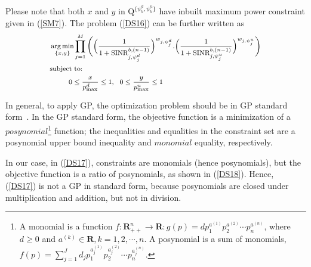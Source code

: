 \documentclass[journal]{IEEEtran}
\DeclareMathOperator*{\argmin}{arg\,min}
\begin{document}
Please note that both $x$ and $y$ in $\mathrm{Q}^{\{\psi_b^d, \psi_b^u\}}$ have inbuilt maximum power constraint given in (\ref{SM7}). The problem (\ref{DS16}) can be further written as
\begin{equation}\label{DS17}
\footnotesize{
\begin{split}
    & \argmin_{\{x,y\}}  {\prod_{j = 1}^{M} \Bigg( \bigg( \frac{1}{1+{\text{SINR}}^{b,(n-1)}_{j,\psi_j^d}}\bigg)^{w_{j,\psi_j^d}}. \bigg( \frac{1}{1+{\text{SINR}}^{b,(n-1)}_{j,\psi_j^u}}\bigg)^{w_{j,\psi_j^u}} \Bigg)}\\
    &\mbox{subject to:} \\
    & \ \ \ \ \ \ \ \ 0 \le \frac{x}{p_{\mathrm{max}}^{d}} \le 1, ~~ 0 \le \frac{y}{p_{\mathrm{max}}^{u}} \le 1
\end{split}}
\end{equation} 

In general, to apply GP, the optimization problem should be in GP standard form~\cite{boyd2007tutorial, chiang2007power}. In the GP standard form, the objective function is a minimization of a $\textit {posynomial}$\footnote{ A monomial is a function $f:\mathbf{R}_{++}^n \rightarrow \mathbf{R}: g(p) = d p_1^{a^{(1)}}p_2^{a^{(2)}}\cdots p_n^{a^{(n)}}$, where $d \geq 0$ and $a^{(k)} \in \mathbf{R}, k = 1,2,\cdots,n.$ A posynomial is a sum of monomials, $f(p) = \sum_{j=1}^J d_j p_1^{a_j^{(1)}} p_2^{a_j^{(2)}} \cdots p_n^{a_j^{(n)}}$. } function; the inequalities and equalities in the constraint set are a posynomial upper bound inequality and $\textit {monomial}$ equality, respectively. 

In our case, in (\ref{DS17}), constraints are monomials (hence posynomials), but the objective function is a ratio of posynomials, as shown in  (\ref{DS18}). Hence, (\ref{DS17}) is not a GP in standard form, because posynomials are closed under multiplication and addition, but not in division.
\end{document}
